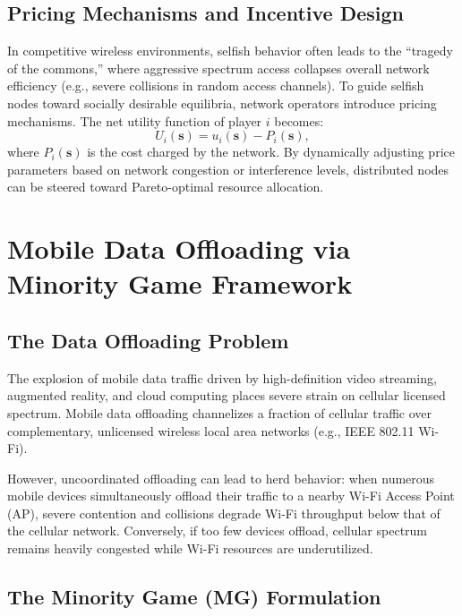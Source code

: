 \subsection{Pricing Mechanisms and Incentive Design}
In competitive wireless environments, selfish behavior often leads to the ``tragedy of the commons,'' where aggressive spectrum access collapses overall network efficiency (e.g., severe collisions in random access channels). To guide selfish nodes toward socially desirable equilibria, network operators introduce pricing mechanisms. The net utility function of player $i$ becomes:
\begin{equation}
    U_i(\mathbf{s}) = u_i(\mathbf{s}) - P_i(\mathbf{s}),
\end{equation}
where $P_i(\mathbf{s})$ is the cost charged by the network. By dynamically adjusting price parameters based on network congestion or interference levels, distributed nodes can be steered toward Pareto-optimal resource allocation.

\section{Mobile Data Offloading via Minority Game Framework}
\label{sec:minority_game_offloading}

\subsection{The Data Offloading Problem}
The explosion of mobile data traffic driven by high-definition video streaming, augmented reality, and cloud computing places severe strain on cellular licensed spectrum. Mobile data offloading channelizes a fraction of cellular traffic over complementary, unlicensed wireless local area networks (e.g., IEEE 802.11 Wi-Fi).

However, uncoordinated offloading can lead to herd behavior: when numerous mobile devices simultaneously offload their traffic to a nearby Wi-Fi Access Point (AP), severe contention and collisions degrade Wi-Fi throughput below that of the cellular network. Conversely, if too few devices offload, cellular spectrum remains heavily congested while Wi-Fi resources are underutilized.

\subsection{The Minority Game (MG) Formulation}

